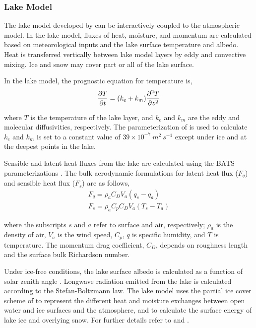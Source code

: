 \subsubsection{Lake Model}
The lake model developed by  \cite{Hostetler_93} can be interactively 
coupled to the atmospheric model.  In the lake model, fluxes of 
heat, moisture, and momentum are calculated based on meteorological 
inputs and the lake surface temperature and albedo.  Heat is transferred
vertically between lake model layers by eddy and convective mixing.
Ice and snow may cover part or all of the lake surface.

In the lake model, the prognostic equation for temperature is, 
\begin{eqnarray}
{\partial{T} \over \partial{t}} = (k_e + k_m) {\partial^2{T} \over \partial{z}^2 }
\end{eqnarray}

\noindent
where $T$ is the temperature of the lake layer, and $k_e$ and $k_m$ are the eddy 
and molecular diffusivities, respectively.   
The parameterization of \cite{Henderson-Sellers_86} is used to calculate $k_e$ and
$k_m$ is set to a constant value of $39 \times 10^{-7}~m^2~s^{-1}$ except under ice 
and at the deepest points in the lake.

Sensible and latent heat fluxes from the lake are calculated using  
the BATS parameterizations \cite{Dickinson_93}.  The bulk aerodynamic
formulations for latent heat flux ($F_q$) and sensible heat flux ($F_s$) are as 
follows, 
\begin{eqnarray}
F_q = \rho_a C_D V_a (q_s - q_a) \\
F_s = \rho_a C_p C_D V_a (T_s - T_a)
\end{eqnarray}

\noindent
where the subscripts $s$ and $a$ refer to surface and air, respectively;
$\rho_a$ is the density of air, $V_a$ is the wind speed, $C_p$, $q$ is 
specific humidity, and $T$ is temperature.  The momentum drag coefficient,
$C_D$, depends on roughness length and the surface bulk Richardson number.


Under ice-free conditions, the lake surface albedo is calculated as a function 
of solar zenith angle \cite{Henderson-Sellers_86}.  Longwave radiation emitted 
from the lake is calculated according to the Stefan-Boltzmann law. 
The lake model uses the partial ice cover scheme of \cite{Patterson_88} 
to represent the different heat and moisture exchanges between open water 
and ice surfaces and the atmosphere, and to calculate the surface energy 
of lake ice and overlying snow.  For further details refer to \cite{Hostetler_93} and 
\cite{Small_99b}. 

